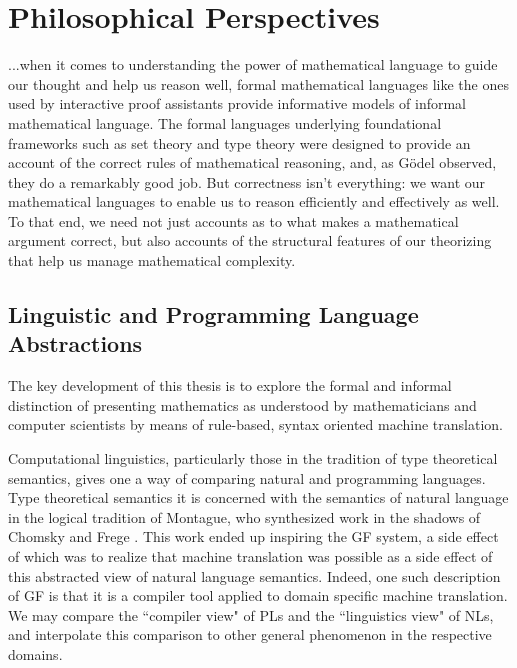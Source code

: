 \section{Philosophical Perspectives}

\begin{displayquote}

...when it comes to understanding the power of mathematical language to guide our
thought and help us reason well, formal mathematical languages like the ones
used by interactive proof assistants provide informative models of informal
mathematical language. The formal languages underlying foundational frameworks
such as set theory and type theory were designed to provide an account of the
correct rules of mathematical reasoning, and, as Gödel observed, they do a
remarkably good job. But correctness isn’t everything: we want our mathematical
languages to enable us to reason efficiently and effectively as well. To that
end, we need not just accounts as to what makes a mathematical argument correct,
but also accounts of the structural features of our theorizing that help us
manage mathematical complexity.\cite{avigad2015mathematics}

\end{displayquote}

\subsection{Linguistic and Programming Language Abstractions}

The key development of this thesis is to explore the formal and informal
distinction of presenting mathematics as understood by mathematicians and computer
scientists by means of rule-based, syntax oriented machine translation.

Computational linguistics, particularly those in the tradition of type
theoretical semantics\cite{ranta1994type}, gives one a way of comparing natural
and programming languages. Type theoretical semantics it is concerned with the
semantics of natural language in the logical tradition of Montague, who
synthesized work in the shadows of Chomsky \cite{Chomsky57} and Frege
\cite{frege79}. This work ended up inspiring the GF system, a side effect of
which was to realize that machine translation was possible as a side effect of
this abstracted view of natural language semantics. Indeed, one such description
of GF is that it is a compiler tool applied to domain specific machine
translation. We may compare the ``compiler view" of PLs and the ``linguistics view"
of NLs, and interpolate this comparison to other general phenomenon in the
respective domains.

